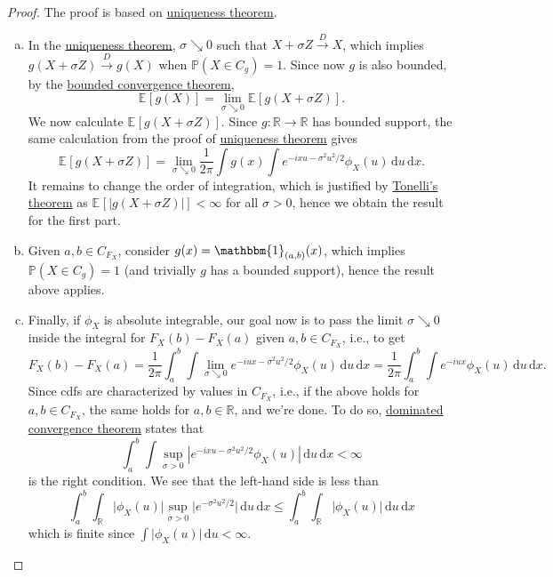 \begin{proof}
	The proof is based on \hyperref[thm:characteristic-function-uniqueness]{uniqueness theorem}.
	\begin{enumerate}[(a)]
		\item In the \hyperref[thm:characteristic-function-uniqueness]{uniqueness theorem}, \(\sigma \searrow 0\) such that \(X+ \sigma Z \overset{D}{\to } X\), which implies \(g(X + \sigma Z) \overset{D}{\to } g(X)\) when \(\mathbb{P} (X \in C_g) = 1\). Since now \(g\) is also bounded, by the \href{https://en.wikipedia.org/wiki/Dominated_convergence_theorem}{bounded convergence theorem},
		      \[
			      \mathbb{E}_{}[g(X)] = \lim_{\sigma \searrow 0} \mathbb{E}_{}[g(X + \sigma Z)].
		      \]
		      We now calculate \(\mathbb{E}_{}[g(X + \sigma Z)] \). Since \(g\colon \mathbb{R} \to \mathbb{R} \) has bounded support, the same calculation from the proof of \hyperref[thm:characteristic-function-uniqueness]{uniqueness theorem} gives
		      \[
			      \mathbb{E}_{}[g(X + \sigma Z)]
			      = \lim_{\sigma \searrow 0} \frac{1}{2\pi } \int g(x) \int e^{-i x u - \sigma ^2 u^2 / 2} \phi _X(u) \,\mathrm{d} u \,\mathrm{d} x .
		      \]
		      It remains to change the order of integration, which is justified by \href{https://en.wikipedia.org/wiki/Fubini%27s_theorem#Fubini%E2%80%93Tonelli_theorem}{Tonelli's theorem} as \(\mathbb{E}_{}[\vert g(X + \sigma Z) \vert ] < \infty \) for all \(\sigma > 0\), hence we obtain the result for the first part.
		\item Given \(a, b\in C_{F_X}\), consider \(g(x) = \mathbbm{1}_{(a, b)} (x) \), which implies \(\mathbb{P} (X \in C_g) = 1\) (and trivially \(g\) has a bounded support), hence the result above applies.
		\item Finally, if \(\phi _X\) is absolute integrable, our goal now is to pass the limit \(\sigma \searrow 0\) inside the integral for \(F_X(b) - F_X(a)\) given \(a, b \in C_{F_X}\), i.e., to get
		      \[
			      F_X(b) - F_X(a)
			      = \frac{1}{2\pi } \int_{a}^{b} \int \lim_{\sigma \searrow 0} e^{-iux - \sigma ^2 u^2 / 2} \phi _X(u) \,\mathrm{d}u \,\mathrm{d} x
			      = \frac{1}{2\pi } \int_{a}^{b} \int e^{-iux} \phi _X(u) \,\mathrm{d}u \,\mathrm{d} x .
		      \]
		      Since cdfs are characterized by values in \(C_{F_X}\), i.e., if the above holds for \(a, b \in C_{F_X}\), the same holds for \(a, b \in \mathbb{R} \), and we're done. To do so, \href{https://en.wikipedia.org/wiki/Dominated_convergence_theorem}{dominated convergence theorem} states that
		      \[
			      \int_{a}^{b} \int \sup _{\sigma > 0} \left\vert e^{-i x u - \sigma ^2 u^2 / 2} \phi _X (u) \right\vert \,\mathrm{d} u \,\mathrm{d} x < \infty
		      \]
		      is the right condition. We see that the left-hand side is less than
		      \[
			      \int_{a}^{b} \int _\mathbb{R} \vert \phi _X(u) \vert \sup _{\sigma > 0} \vert e^{- \sigma ^2 u^2 / 2} \vert \,\mathrm{d} u \,\mathrm{d} x
			      \leq \int_{a}^{b} \int _\mathbb{R} \vert \phi _X(u) \vert \,\mathrm{d} u \,\mathrm{d} x
		      \]
		      which is finite since \(\int \vert \phi _X(u) \vert \,\mathrm{d} u < \infty \).
	\end{enumerate}
\end{proof}


